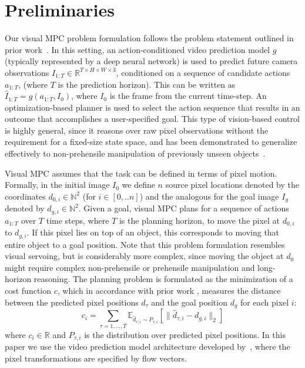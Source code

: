 \vspace{-0.1cm}
\section{Preliminaries}
\label{sec:prelim}
\vspace{-0.2cm}

Our visual MPC problem formulation follows the problem statement outlined in prior work~\cite{foresight}. In this setting, an action-conditioned video prediction model $g$ (typically represented by a deep neural network) is used to predict future camera observations $\hat{I}_{1:T} \in \mathbb{R}^{T \times H\times W \times 3}$, conditioned on a sequence of candidate actions $a_{1:T}$, (where $T$ is the prediction horizon). This can be written as $\hat{I}_{1:T} = g(a_{1:T}, I_0)$, where $I_0$ is the frame from the current time-step. An optimization-based planner is  used to select the action sequence that results in an outcome that accomplishes a user-specified goal. This type of vision-based control is highly general, since it reasons over raw pixel observations without the requirement for a fixed-size state space, and has been demonstrated to generalize effectively to non-prehensile manipulation of previously unseen objects~\cite{foresight,sna}.

Visual MPC assumes that the task can be defined in terms of pixel motion. Formally, in the initial image $I_0$ we define $n$ source pixel locations denoted by the coordinates $d_{0,i} \in \mathbb{N}^2$ (for $i \in [0,..n]$) and the analogous for the goal image $I_g$ denoted by $d_{g,i} \in \mathbb{N}^2$. Given a goal, visual MPC plans for a sequence of actions $a_{1:T}$ over $T$ time steps, where $T$ is the planning horizon,
to move the pixel at $d_{0,i}$ to $d_{g,i}$. If this pixel lies on top of an object, this corresponds to moving that entire object to a goal position. Note that this problem formulation resembles visual servoing, but is considerably more complex, since moving the object at $d_0$ might require complex non-prehensile or prehensile manipulation and long-horizon reasoning.
The planning problem is formulated as the minimization of a cost function $c$, which in accordance with prior work \cite{sna}, measures the distance between the predicted pixel positions $\hat{d}_{\tau}$ and the goal position $d_g$ for each pixel $i$:
\begin{equation}
c_i  = \sum_{\tau = 1, \dots, T} \mathbb{E}_{\hat{d}_{\tau,i} \sim P_{\tau,i}} \left[\|\hat{d}_{\tau,i} - d_{g,i}\|_2\right]  
\label{eq:cost}
\end{equation}
where $c_i \in \mathbb{R}$ and $P_{\tau,i}$ is the distribution over predicted pixel positions. In this paper we use the video prediction model architecture developed by~\citet{savp}, where the pixel transformations are specified by flow vectors.

